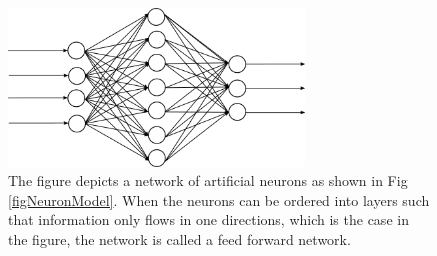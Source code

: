 \begin{figure}[h!]
  \centering
  \includegraphics[width=0.7\textwidth]{fig/feedforward.png}
  \caption{
    The figure depicts a network of artificial neurons as shown in Fig
    \ref{figNeuronModel}.
    When the neurons can be ordered into layers such that information only flows
    in one directions, which is the case in the figure, the network is called a
    feed forward network.
  }
  \label{figFFANN}
\end{figure}
